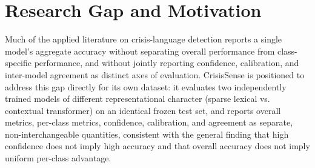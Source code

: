 \section{Research Gap and Motivation}

Much of the applied literature on crisis-language detection reports a single model's aggregate accuracy without separating overall performance from class-specific performance, and without jointly reporting confidence, calibration, and inter-model agreement as distinct axes of evaluation. CrisisSense is positioned to address this gap directly for its own dataset: it evaluates two independently trained models of different representational character (sparse lexical vs. contextual transformer) on an identical frozen test set, and reports overall metrics, per-class metrics, confidence, calibration, and agreement as separate, non-interchangeable quantities, consistent with the general finding that high confidence does not imply high accuracy and that overall accuracy does not imply uniform per-class advantage.
